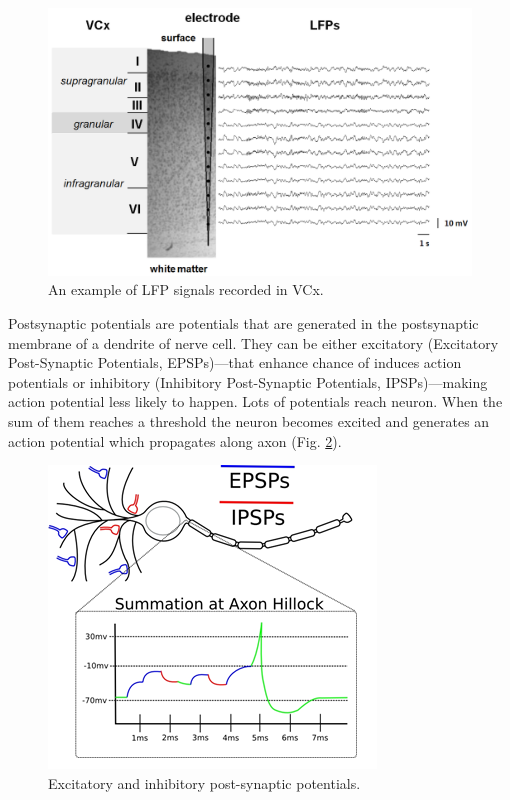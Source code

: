 \documentclass{pracalicmgr}
\begin{document}
        \begin{figure}[H]
        	\begin{center}
        		\includegraphics[scale=0.5]{VCx_LFPs2.png}
        	\end{center}
        	\caption{ An example of LFP signals recorded in VCx.}
        	\label{rys:VCx_LFPs}
        \end{figure} 
        
        Postsynaptic potentials are potentials that are generated in the postsynaptic membrane of a dendrite of nerve cell. They can be either excitatory (Excitatory Post-Synaptic Potentials, EPSPs)---that enhance chance of induces action potentials or inhibitory (Inhibitory Post-Synaptic Potentials, IPSPs)---making action potential less likely to happen. Lots of potentials reach neuron. When the sum of them reaches a threshold the neuron becomes excited and generates an action potential which propagates along axon (Fig. \ref{rys:PSPs}).
        \begin{figure}[htbp]
        	\begin{center}
        		\includegraphics[scale=1]{PSPs.png}
        	\end{center}
        	\caption{Excitatory and inhibitory post-synaptic potentials.}
        	\label{rys:PSPs}
        \end{figure} 
        
\end{document}
